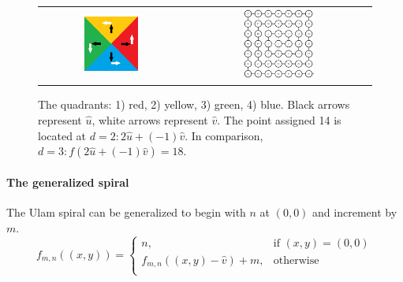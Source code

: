 \documentclass{article}
\begin{document}
\begin{figure}[h!]
	\centering
	\begin{tabular}{cc}
		\includegraphics[width=0.4\textwidth]{quadrants} & \includegraphics[width=0.4\textwidth]{f}
	\end{tabular}
	\caption{The quadrants: 1) red, 2) yellow, 3) green, 4) blue. Black arrows represent \(\hat{u}\), white arrows represent \(\hat{v}\). The point assigned 14 is located at \(d=2:2\hat{u}+(-1)\hat{v}\). In comparison, \(d=3:f(2\hat{u}+(-1)\hat{v})=18\).}
	\label{quadrants}
\end{figure}


\paragraph{The generalized spiral} The Ulam spiral can be generalized to begin with \(n\) at \((0,0)\) and increment by \(m\).
	\[f_{m,n}((x,y)) = \begin{cases}
					   n,							&\text{if } (x,y) = (0,0) \\
					   f_{m,n}((x,y)-\hat{v}) + m,	& \text{otherwise} \\
					   \end{cases}\]
						 
\end{document}
